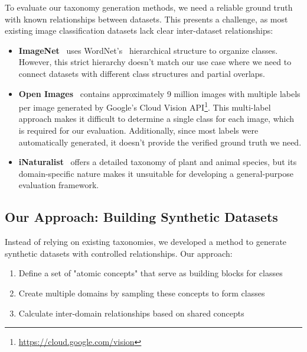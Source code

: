 To evaluate our taxonomy generation methods, we need a reliable ground truth with known relationships between datasets. This presents a challenge, as most existing image classification datasets lack clear inter-dataset relationships:

\begin{itemize}
      \item \textbf{ImageNet}~\cite{deng_imagenet_2009,russakovsky_imagenet_2015}
            uses WordNet's~\cite{fellbaum_wordnet_1998} hierarchical structure to organize classes.
            However, this strict hierarchy doesn't match our use case where we need to connect
            datasets with different class structures and partial overlaps.

      \item \textbf{Open Images}~\cite{kuznetsova_open_2020} contains approximately 9 million
            images with multiple labels per image generated by Google's Cloud Vision API\footnote{\url{https://cloud.google.com/vision}}.
            This multi-label approach makes it difficult to determine a single class for each image,
            which is required for our evaluation. Additionally, since most labels were automatically
            generated, it doesn't provide the verified ground truth we need.

      \item \textbf{iNaturalist}~\cite{horn_inaturalist_2018} offers a detailed taxonomy of
            plant and animal species, but its domain-specific nature makes it unsuitable
            for developing a general-purpose evaluation framework.
\end{itemize}

\subsection{Our Approach: Building Synthetic Datasets}

Instead of relying on existing taxonomies, we developed a method to generate synthetic datasets with controlled relationships. Our approach:

\begin{enumerate}
      \item Define a set of "atomic concepts" that serve as building blocks for classes
      \item Create multiple domains by sampling these concepts to form classes
      \item Calculate inter-domain relationships based on shared concepts
\end{enumerate}

